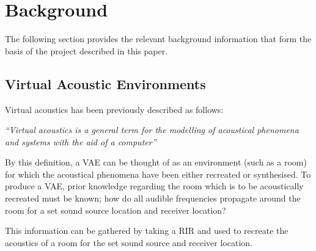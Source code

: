 \documentclass[../../main.tex]{subfiles}
\begin{document}
\section{Background}

	The following section provides the relevant background information that form the basis of the project described in this paper.

	\subsection{Virtual Acoustic Environments}

		 Virtual acoustics has been previously described \cite{Huopaniemi2000} as follows:

		\begin{center}
			\textit{``Virtual acoustics is a general term for the modelling of acoustical phenomena and systems with the aid of a computer''}
		\end{center}

		By this definition, a \ac{VAE} can be thought of as an environment (such as a room) for which the acoustical phenomena have been either recreated or synthesised. To produce a \ac{VAE}, prior knowledge regarding the room which is to be acoustically recreated must be known; how do all audible frequencies propagate around the room for a set sound source location and receiver location?

		This information can be gathered by taking a \ac{RIR} and used to recreate the acoustics of a room for the set sound source and receiver location.




\end{document}

